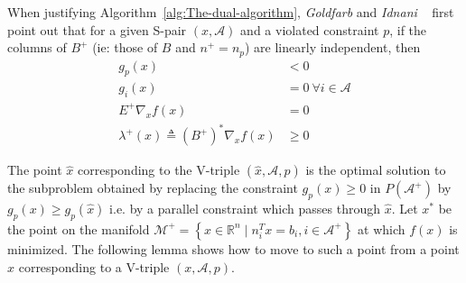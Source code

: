 \documentclass[a4paper,twoside,10pt,english]{report}
\begin{document}
When justifying Algorithm~\ref{alg:The-dual-algorithm}, 
\emph{Goldfarb} and \emph{Idnani}
~\cite[p. 7]{GoldfarbIdnani_NumericallyStableDualQuadraticPrograms}
first point out that for a given S-pair $\left(x,\mathcal{A}\right)$
and a violated constraint $p$, if the columns of $B^{+}$ (ie: those
of $B$ and $n^{+}=n_{p}$) are linearly independent, then 
\begin{align*}
g_{p}\left(x\right) & < 0\\
g_{i}\left(x\right) &= 0 ~ \forall i \in \mathcal{A}\\
E^{+}\nabla_{x}f\left(x\right) &= 0\\
\lambda^{+}\left(x\right)\triangleq\left(B^{+}\right)^{*}\nabla_{x}f\left(x\right) & \ge 0
\end{align*}


The point $\hat{x}$ corresponding to the V-triple $(\hat{x},\mathcal{A},p)$
is the optimal solution to the subproblem obtained by replacing the
constraint $g_{p}\left(x\right) \ge 0$ in $P\left(\mathcal{A}^{+}\right)$
by$g_{p}\left(x\right)\ge g_{p}\left(\hat{x}\right)$ i.e. by a parallel
constraint which passes through $\hat{x}$. Let $x^{*}$ be the point
on the manifold $\mathcal{M}^{+}=\left\{ x\in\mathbb{R}^{n}\mid n_{i}^{T}x=b_{i},i\in\mathcal{A}^{+}\right\} $
at which $f(x)$ is minimized. The following lemma shows how to move
to such a point from a point $x$ corresponding to a V-triple $(x,\mathcal{A},p)$.
\end{document}
